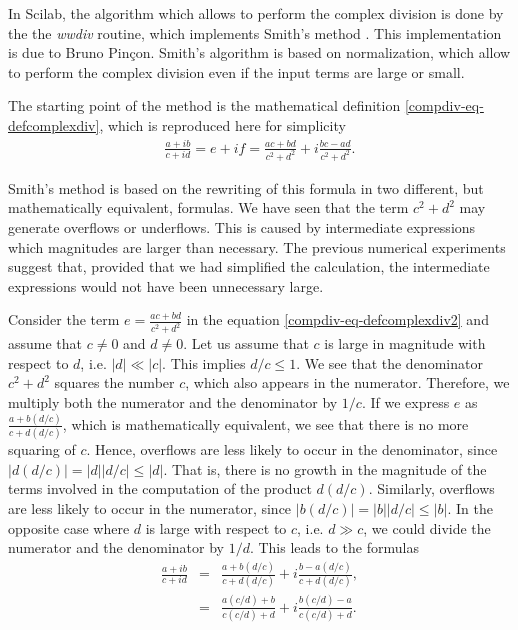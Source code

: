 In Scilab, the algorithm which allows to perform the complex 
division is done by the the \emph{wwdiv} routine, which implements  
Smith's method \cite{Smith1962}.
This implementation is due to Bruno Pin{\c c}on.
Smith's algorithm is based on normalization, which allow to 
perform the complex division even if the input terms are large or small. 

The starting point of the method is the mathematical definition \ref{compdiv-eq-defcomplexdiv},
which is reproduced here for simplicity
\begin{eqnarray}
\label{compdiv-eq-defcomplexdiv2}
\frac{a + ib}{c + id} = e+if = \frac{ac + bd}{c^2 + d^2} + i \frac{bc - ad}{c^2 + d^2}.
\end{eqnarray}

Smith's method is based on the rewriting of this formula in 
two different, but mathematically equivalent, formulas. 
We have seen that the term $c^2 + d^2$ may generate overflows or underflows.
This is caused by intermediate expressions which magnitudes are larger than necessary.
The previous numerical experiments suggest that, provided that we 
had simplified the calculation, the intermediate expressions 
would not have been unnecessary large. 

Consider the term $e=\frac{ac + bd}{c^2 + d^2}$ in the equation \ref{compdiv-eq-defcomplexdiv2}
and assume that $c\neq 0$ and $d\neq0$.
Let us assume that $c$ is large in magnitude with respect to $d$, i.e. $|d|\ll|c|$. 
This implies $d/c \leq 1$. We see that the denominator $c^2 + d^2$ 
squares the number $c$, which also appears in the numerator. Therefore, 
we multiply both the numerator and the denominator by $1/c$. If we  
express $e$ as $\frac{a + b(d/c)}{c + d (d/c)}$, which is 
mathematically equivalent, we see that there is no more squaring of $c$.
Hence, overflows are less likely to occur in the denominator, since $|d (d/c)|= |d| |d/c| \leq |d|$.
That is, there is no growth in the magnitude of the terms involved in the 
computation of the product $d(d/c)$.
Similarly, overflows are less likely to occur in the numerator, since 
$|b(d/c)|= |b| |d/c| \leq |b|$. In the opposite case where $d$ is large with 
respect to $c$, i.e. $d\gg c$, we could divide the numerator and the denominator by $1/d$.
This leads to the formulas
\begin{eqnarray}
\frac{a + ib}{c + id} 
&=& \frac{a + b(d/c)}{c + d(d/c)} + i \frac{b - a(d/c)}{c + d(d/c)}, \\
&=& \frac{a(c/d) + b}{c(c/d) + d} + i \frac{b(c/d) - a}{c(c/d) + d}. 
\end{eqnarray}

